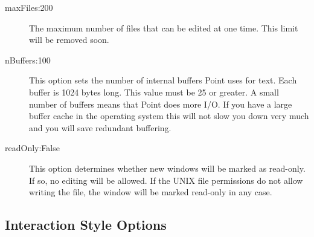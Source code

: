 \begin{description}
\item[maxFiles:200]
The maximum number of files that can be edited at one time.
This limit will be removed soon.

\item[nBuffers:100]
This option sets the number of internal buffers Point uses for text.
Each buffer is 1024 bytes long.
This value must be 25 or greater.
A small number of buffers means that Point does more I/O.
If you have a large buffer cache in the operating system
this will not slow you down very much and you will save
redundant buffering.

\item[readOnly:False]
This option determines whether new windows will be marked as read-only.
If so, no editing will be allowed.
If the UNIX file permissions do not allow writing the file,
the window will be marked read-only in any case.

\end{description}



\subsection{Interaction Style Options}

